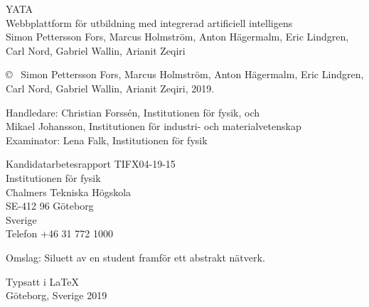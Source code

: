 \newpage
\thispagestyle{plain}
\vspace*{4.5cm}
\noindent YATA\\
Webbplattform för utbildning med integrerad artificiell intelligens\\
Simon Pettersson Fors, Marcus Holmström, Anton Hägermalm, Eric Lindgren, Carl Nord, Gabriel Wallin, Arianit Zeqiri \setlength{\parskip}{1cm}

\noindent \copyright ~ Simon Pettersson Fors, Marcus Holmström, Anton Hägermalm, Eric Lindgren, Carl Nord, Gabriel Wallin, Arianit Zeqiri, 2019.

\noindent Handledare: Christian Forssén, Institutionen för fysik, och \\
        \hspace*{61px} Mikael Johansson, Institutionen för industri- och materialvetenskap\\
Examinator: Lena Falk, Institutionen för fysik \setlength{\parskip}{1cm}

\noindent Kandidatarbetesrapport TIFX04-19-15\\	%
Institutionen för fysik\\
Chalmers Tekniska Högskola\\
SE-412 96 Göteborg\\
Sverige\\
Telefon +46 31 772 1000 \setlength{\parskip}{0.5cm}

\vfill
\noindent Omslag: Siluett av en student framför ett abstrakt nätverk. \setlength{\parskip}{0.5cm}


\noindent Typsatt i \LaTeX \\
Göteborg, Sverige 2019

